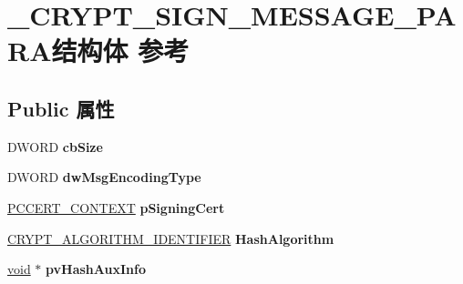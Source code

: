 \hypertarget{struct___c_r_y_p_t___s_i_g_n___m_e_s_s_a_g_e___p_a_r_a}{}\section{\+\_\+\+C\+R\+Y\+P\+T\+\_\+\+S\+I\+G\+N\+\_\+\+M\+E\+S\+S\+A\+G\+E\+\_\+\+P\+A\+R\+A结构体 参考}
\label{struct___c_r_y_p_t___s_i_g_n___m_e_s_s_a_g_e___p_a_r_a}
\subsection*{Public 属性}
\begin{DoxyCompactItemize}
\item 
\mbox{\label{struct___c_r_y_p_t___s_i_g_n___m_e_s_s_a_g_e___p_a_r_a_a8aa924b5acf4c8f249ab404b75212cf3}} 
D\+W\+O\+RD {\bfseries cb\+Size}
\item 
\mbox{\label{struct___c_r_y_p_t___s_i_g_n___m_e_s_s_a_g_e___p_a_r_a_a7e211d325f6cc392f134350f76393601}} 
D\+W\+O\+RD {\bfseries dw\+Msg\+Encoding\+Type}
\item 
\mbox{\label{struct___c_r_y_p_t___s_i_g_n___m_e_s_s_a_g_e___p_a_r_a_a9e015ac14934c4b53ac3a6e3943f7d24}} 
\hyperlink{struct___c_e_r_t___c_o_n_t_e_x_t}{P\+C\+C\+E\+R\+T\+\_\+\+C\+O\+N\+T\+E\+XT} {\bfseries p\+Signing\+Cert}
\item 
\mbox{\label{struct___c_r_y_p_t___s_i_g_n___m_e_s_s_a_g_e___p_a_r_a_a35b09a3590861adce2f2f7b7528898ae}} 
\hyperlink{struct___c_r_y_p_t___a_l_g_o_r_i_t_h_m___i_d_e_n_t_i_f_i_e_r}{C\+R\+Y\+P\+T\+\_\+\+A\+L\+G\+O\+R\+I\+T\+H\+M\+\_\+\+I\+D\+E\+N\+T\+I\+F\+I\+ER} {\bfseries Hash\+Algorithm}
\item 
\mbox{\label{struct___c_r_y_p_t___s_i_g_n___m_e_s_s_a_g_e___p_a_r_a_a00d250dd5a7459f96d19b2d9496299c8}} 
\hyperlink{interfacevoid}{void} $\ast$ {\bfseries pv\+Hash\+Aux\+Info}
\item 
\mbox{\label{struct___c_r_y_p_t___s_i_g_n___m_e_s_s_a_g_e___p_a_r_a_ab71d0a788c46f9b33d4b33c9dd6fda7c}} 

\end{DoxyCompactItemize}
